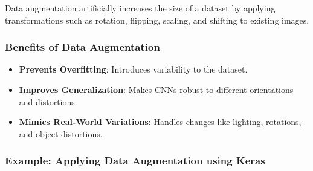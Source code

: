 \documentclass[
  letterpaper,
  DIV=11,
  numbers=noendperiod]{scrreprt}
\providecommand{\tightlist}{%
  \setlength{\itemsep}{0pt}\setlength{\parskip}{0pt}}\usepackage{longtable,booktabs,array}
\begin{document}
Data augmentation artificially increases the size of a dataset by
applying transformations such as rotation, flipping, scaling, and
shifting to existing images.

\subsubsection{Benefits of Data
Augmentation}\label{benefits-of-data-augmentation}

\begin{itemize}
\tightlist
\item
  \textbf{Prevents Overfitting}: Introduces variability to the dataset.
\item
  \textbf{Improves Generalization}: Makes CNNs robust to different
  orientations and distortions.
\item
  \textbf{Mimics Real-World Variations}: Handles changes like lighting,
  rotations, and object distortions.
\end{itemize}

\subsubsection{Example: Applying Data Augmentation using
Keras}\label{example-applying-data-augmentation-using-keras}
\end{document}
